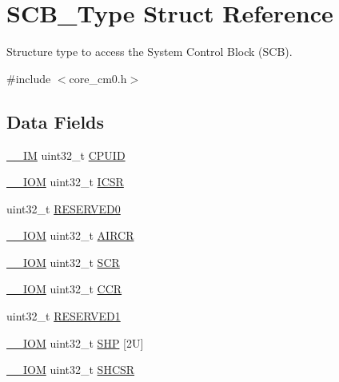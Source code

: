 \hypertarget{struct_s_c_b___type}{}\section{S\+C\+B\+\_\+\+Type Struct Reference}
\label{struct_s_c_b___type}


Structure type to access the System Control Block (S\+CB).  




{\ttfamily \#include $<$core\+\_\+cm0.\+h$>$}

\subsection*{Data Fields}
\begin{DoxyCompactItemize}
\item 
\hyperlink{core__sc300_8h_a4cc1649793116d7c2d8afce7a4ffce43}{\+\_\+\+\_\+\+IM} uint32\+\_\+t \hyperlink{struct_s_c_b___type_adbf8292503748ba6421a523bdee6819d}{C\+P\+U\+ID}
\item 
\hyperlink{core__sc300_8h_ab6caba5853a60a17e8e04499b52bf691}{\+\_\+\+\_\+\+I\+OM} uint32\+\_\+t \hyperlink{struct_s_c_b___type_aced895d6aba03d72b0d865fcc5ce44ee}{I\+C\+SR}
\item 
uint32\+\_\+t \hyperlink{struct_s_c_b___type_af86c61a5d38a4fc9cef942a12744486b}{R\+E\+S\+E\+R\+V\+E\+D0}
\item 
\hyperlink{core__sc300_8h_ab6caba5853a60a17e8e04499b52bf691}{\+\_\+\+\_\+\+I\+OM} uint32\+\_\+t \hyperlink{struct_s_c_b___type_a9b6ccd9c0c0865f8facad77ea37240b0}{A\+I\+R\+CR}
\item 
\hyperlink{core__sc300_8h_ab6caba5853a60a17e8e04499b52bf691}{\+\_\+\+\_\+\+I\+OM} uint32\+\_\+t \hyperlink{struct_s_c_b___type_acac65f229cb3fcb5369a0a9e0393b8c0}{S\+CR}
\item 
\hyperlink{core__sc300_8h_ab6caba5853a60a17e8e04499b52bf691}{\+\_\+\+\_\+\+I\+OM} uint32\+\_\+t \hyperlink{struct_s_c_b___type_ad68b5c1f2d9845ef4247cf2d9b041336}{C\+CR}
\item 
uint32\+\_\+t \hyperlink{struct_s_c_b___type_ac4ac04e673b5b8320d53f7b0947db902}{R\+E\+S\+E\+R\+V\+E\+D1}
\item 
\hyperlink{core__sc300_8h_ab6caba5853a60a17e8e04499b52bf691}{\+\_\+\+\_\+\+I\+OM} uint32\+\_\+t \hyperlink{struct_s_c_b___type_aa043193516e3fc0abbf58ce7cf8cfb4e}{S\+HP} \mbox{[}2\+U\mbox{]}
\item 
\hyperlink{core__sc300_8h_ab6caba5853a60a17e8e04499b52bf691}{\+\_\+\+\_\+\+I\+OM} uint32\+\_\+t \hyperlink{struct_s_c_b___type_a44ad5c292dbd77e72f310902375a8a06}{S\+H\+C\+SR}

\end{DoxyCompactItemize}

